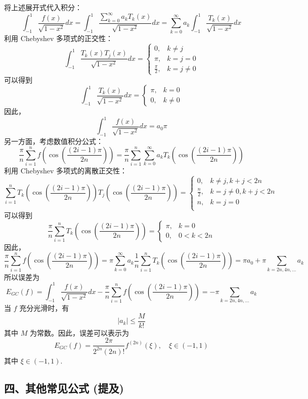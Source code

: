 将上述展开式代入积分：
\[
\int_{-1}^1 \frac{f(x)}{\sqrt{1-x^2}} dx = \int_{-1}^1 \frac{\sum_{k=0}^{\infty} a_k T_k(x)}{\sqrt{1-x^2}} dx = \sum_{k=0}^{\infty} a_k \int_{-1}^1 \frac{T_k(x)}{\sqrt{1-x^2}} dx
\]
利用 Chebyshev 多项式的正交性：
\[
\int_{-1}^1 \frac{T_k(x) T_j(x)}{\sqrt{1-x^2}} dx = \begin{cases} 0, & k \neq j \\ \pi, & k = j = 0 \\ \frac{\pi}{2}, & k = j \neq 0 \end{cases}
\]
可以得到
\[
\int_{-1}^1 \frac{T_k(x)}{\sqrt{1-x^2}} dx = \begin{cases} \pi, & k = 0 \\ 0, & k \neq 0 \end{cases}
\]
因此，
\[
\int_{-1}^1 \frac{f(x)}{\sqrt{1-x^2}} dx = a_0 \pi
\]
另一方面，考虑数值积分公式：
\[
\frac{\pi}{n} \sum_{i=1}^n f\left(\cos\left(\frac{(2i-1)\pi}{2n}\right)\right) = \frac{\pi}{n} \sum_{i=1}^n \sum_{k=0}^{\infty} a_k T_k\left(\cos\left(\frac{(2i-1)\pi}{2n}\right)\right)
\]
利用 Chebyshev 多项式的离散正交性：
\[
\sum_{i=1}^n T_k\left(\cos\left(\frac{(2i-1)\pi}{2n}\right)\right) T_j\left(\cos\left(\frac{(2i-1)\pi}{2n}\right)\right) = \begin{cases} 0, & k \neq j, k+j < 2n \\ \frac{n}{2}, & k = j \neq 0, k+j < 2n \\ n, & k = j = 0 \\ \end{cases}
\]
可以得到
\[
\frac{\pi}{n} \sum_{i=1}^n T_k\left(\cos\left(\frac{(2i-1)\pi}{2n}\right)\right) = \begin{cases} \pi, & k = 0 \\ 0, & 0 < k < 2n \end{cases}
\]
因此，
\[
\frac{\pi}{n} \sum_{i=1}^n f\left(\cos\left(\frac{(2i-1)\pi}{2n}\right)\right) = \pi \sum_{k=0}^{\infty} a_k \frac{1}{n} \sum_{i=1}^n T_k\left(\cos\left(\frac{(2i-1)\pi}{2n}\right)\right) = \pi a_0 + \pi \sum_{k=2n, 4n, \dots} a_k
\]
所以误差为
\[
E_{GC}(f) = \int_{-1}^1 \frac{f(x)}{\sqrt{1-x^2}} dx - \frac{\pi}{n} \sum_{i=1}^n f\left(\cos\left(\frac{(2i-1)\pi}{2n}\right)\right) = - \pi \sum_{k=2n, 4n, \dots} a_k
\]
当 $f$ 充分光滑时，有
\[
|a_k| \leq \frac{M}{k!}
\]
其中 $M$ 为常数。因此，误差可以表示为
\[
E_{GC}(f) = \frac{2\pi}{2^{2n}(2n)!} f^{(2n)}(\xi), \quad \xi \in (-1,1)
\]
其中 $\xi \in (-1,1)$.

\subsection{四、其他常见公式 (提及)}

